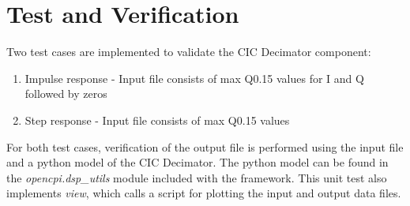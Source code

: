 \section*{Test and Verification}
Two test cases are implemented to validate the CIC Decimator component:

\begin{enumerate}
	\item Impulse response - Input file consists of max Q0.15 values for I and Q followed by zeros
	\item Step response - Input file consists of max Q0.15 values
\end{enumerate}\medskip

For both test cases, verification of the output file is performed using the input file and a python model of the CIC Decimator. The python model can be found in the \textit{opencpi.dsp\_utils} module included with the framework. This unit test also implements \textit{view}, which calls a script for plotting the input and output data files.
